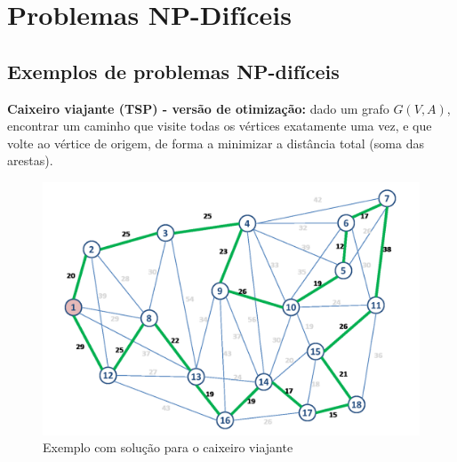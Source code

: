 \section{Problemas NP-Difíceis}
\subsection{Exemplos de problemas NP-difíceis}

\begin{trivlist}
\item \textbf{Caixeiro viajante (TSP) - versão de otimização:} dado um grafo $G(V, A)$, encontrar um caminho que visite todas os vértices exatamente uma vez, e que volte ao vértice de origem, de forma a minimizar a distância total (soma das arestas).
\end{trivlist}

\begin{figure}[h!]
    \centering
    \includegraphics[scale=0.22]{img/tsp.png}
    \captionsetup{labelformat=empty}
    \caption{Exemplo com solução para o caixeiro viajante \cite{valeri2019}}
\end{figure}